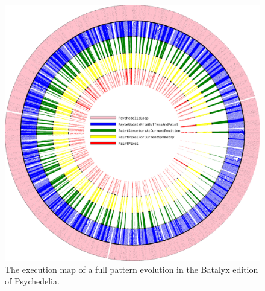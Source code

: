 \begin{figure}[H]                                                          
  \centering                                                             
  \begin{adjustbox}{width=13cm,center}                                   
  \includegraphics[width=13cm]{src/after_effects/execution_cycle.png}%
  \end{adjustbox}                                                        
\caption{The execution map of a full pattern evolution in the Batalyx edition of Psychedelia.}                                           
\end{figure}                                                               

